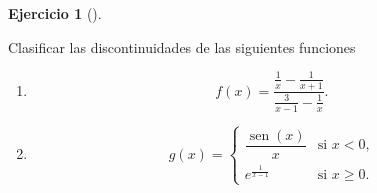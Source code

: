\documentclass[
  a4paper,
]{scrreport}
\theoremstyle{definition}
\newtheorem{exercise}{Ejercicio}[chapter]
\theoremstyle{remark}
\begin{document}
\begin{exercise}[]\protect\hypertarget{exr-clasificacion-dicontinuidades-2}{}\label{exr-clasificacion-dicontinuidades-2}

Clasificar las discontinuidades de las siguientes funciones

\begin{enumerate}
\def\labelenumi{\alph{enumi}.}
\item
  \[
  f(x)=\frac{\frac{1}{x}-\frac{1}{x+1}}{\frac{3}{x-1}-\frac{1}{x}}.
  \]
\item
  \[
  g(x)=
  \begin{cases}
  \dfrac{\operatorname{sen}(x)}{x} & \text{si $x<0$,} \\ 
  e^{\frac{1}{x-1}} & \text{si $x\geq 0$.}
  \end{cases}
  \]
\end{enumerate}

\end{exercise}
\end{document}
